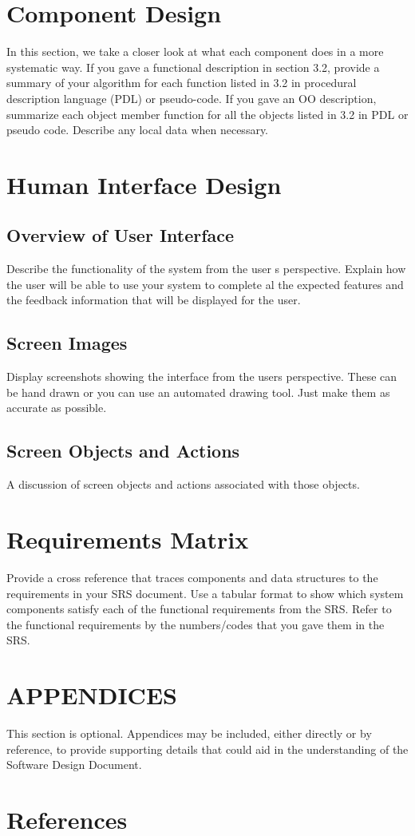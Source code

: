\documentclass[12pt]{article}
\begin{document}
\section{Component Design}
In this section, we take a closer look at what each component does in a more systematic way. If you gave a functional description in section 3.2, provide a summary of your algorithm for each 
function listed in 3.2 in procedural description language (PDL) or pseudo-code. If you gave an 
OO description, summarize each object member function for all the objects listed in 3.2 in PDL
or pseudo code. Describe any local data when necessary.


\section{Human Interface Design}

\subsection {Overview of User Interface}
Describe the functionality of the system from the user s perspective. Explain  how the user 
will be  able  to use  your system to complete  al the  expected  features and  the  feedback 
information that will be displayed for the user.

\subsection {Screen Images}
Display screenshots showing the interface from the users perspective. These can be  hand drawn
or you can use an automated drawing tool. Just make them as accurate as possible.



\subsection {Screen Objects and Actions}
A discussion of screen objects and actions associated with those objects.


\section{Requirements Matrix}
Provide a cross reference that traces components and data structures to the requirements in your
SRS document.
Use  a  tabular  format to show  which system  components satisfy each of the  functional 
requirements from the SRS. Refer to the functional requirements by the numbers/codes that you 
gave them in the SRS.


\section{APPENDICES}
This section is optional.
Appendices may be included, either directly or by reference, to provide supporting details that could 
aid in the understanding of the Software Design Document.

\section {References}



\end{document}
